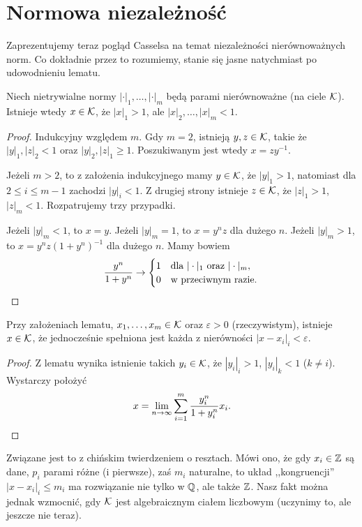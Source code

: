 \section{Normowa niezależność}
Zaprezentujemy  teraz pogląd Casselsa na temat niezależności nierównoważnych norm.
Co dokładnie przez to rozumiemy, stanie się jasne natychmiast po udowodnieniu lematu.

\begin{lemat}
	Niech nietrywialne normy $|\cdot|_1, \ldots, |\cdot|_m$ będą parami nierównoważne (na ciele $\mathcal K$).
	Istnieje wtedy $x \in \mathcal K$, że $|x|_1 > 1$, ale $|x|_2, \ldots, |x|_m < 1$.
\end{lemat}

\begin{proof}
	Indukcyjny względem $m$.
	Gdy $m = 2$, istnieją $y, z \in \mathcal K$, takie że $|y|_1, |z|_2 < 1$ oraz $|y|_2, |z|_1 \ge 1$.
	Poszukiwanym jest wtedy $x = zy^{-1}$.
	
	Jeżeli $m > 2$, to z założenia indukcyjnego mamy $y \in \mathcal K$, że $|y|_1 > 1$, natomiast dla $2 \le i \le m-1$ zachodzi $|y|_i < 1$.
	Z drugiej strony istnieje $z \in \mathcal K$, że $|z|_1 > 1$, $|z|_m < 1$.
	Rozpatrujemy trzy przypadki.

	Jeżeli $|y|_m < 1$, to $x = y$.
	Jeżeli $|y|_m = 1$, to $x = y^nz$ dla dużego $n$.
	Jeżeli $|y|_m > 1$, to $x = y^n z (1 + y^n)^{-1}$ dla dużego $n$.
	Mamy bowiem
	\[
		\frac{y^n}{1 + y^n} \to \begin{cases} 
		1 & \text{dla } |\cdot|_1 \text{ oraz } |\cdot|_m, \\
		0 & \text{w przeciwnym razie.}
		\end{cases} \qedhere
	\]
\end{proof}

\begin{fakt}
	Przy założeniach lematu, $x_1, \ldots, x_m \in \mathcal K$ oraz $\varepsilon > 0$ (rzeczywistym), istnieje $x \in \mathcal K$, że jednocześnie spełniona jest każda z nierówności $|x-x_i|_i < \varepsilon$.
\end{fakt}

\begin{proof}
	Z lematu wynika istnienie takich $y_i \in \mathcal K$, że $|y_i|_i > 1$, $|y_i|_k < 1$ ($k \neq i$).
	Wystarczy położyć
	\[
		x = \lim_{n \to \infty} \sum_{i=1}^m \frac{y_i^n}{1 + y_i^n} x_i. \qedhere
	\]
\end{proof}

Związane jest to z chińskim twierdzeniem o resztach.
Mówi ono, że gdy $x_i \in \mathbb Z$ są dane, $p_i$ parami różne (i pierwsze), zaś $m_i$ naturalne, to układ ,,kongruencji'' $|x - x_i|_i \le m_i$
ma rozwiązanie nie tylko w $\mathbb Q$, ale także $\mathbb Z$.
Nasz fakt można jednak wzmocnić, gdy $\mathcal K$ jest algebraicznym ciałem liczbowym (uczynimy to, ale jeszcze nie teraz).

